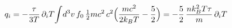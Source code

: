 \documentclass[preview]{standalone}
\begin{document}
\begin{align*}
\special{dvisvgm:raw <g id='unique000'>}q_i=-\frac{\tau}{3T}\,\partial_iT\!\int\! d^3v\,f_0\,\tfrac12mc^2\,c^2\Big(\frac{mc^2}{2k_BT}-\frac52\Big)=-\frac52\,\frac{nk_B^2T\tau}{m}\,\partial_iT\special{dvisvgm:raw </g>}
\end{align*}
\end{document}
